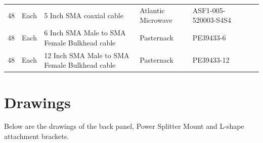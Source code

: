 \documentclass[12pt,a4paper,oneside]{article}
\begin{document}
\begin{landscape}
\begin{table}[H]
{\begin{tabular}{@{}lllllll@{}}
48 & Each & 5 Inch SMA coaxial cable & Atlantic Microwave & ASF1-005-520003-S4S4 &&\\
48 & Each & 6 Inch SMA Male to SMA Female Bulkhead cable & Pasternack & PE39433-6 &&\\
48 & Each & 12 Inch SMA Male to SMA Female Bulkhead cable & Pasternack & PE39433-12 &&\\
\bottomrule            
\end{tabular}}
\label{tab:IF_components}
\end{table}


\section{Drawings}
\label{sec:Drawings}
Below are the drawings of the back panel, Power Splitter Mount and L-shape attachment brackets.





\end{landscape}

%
%
\end{document}
